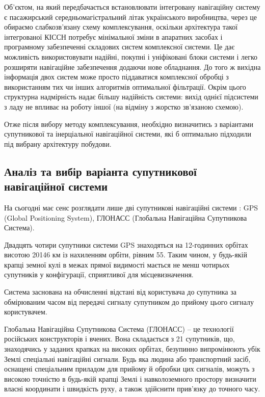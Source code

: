 Об'єктом, на який передбачається встановлювати інтегровану навігаційну систему є пасажирський середньомагістральний літак українського виробництва, через це обираємо  слабкозв’язану схему комплексування, оскільки архітектура такої інтегрованої КІССН потребує мінімальної зміни в апаратних засобах і програмному забезпеченні складових систем комплексної системи. Це дає можливість використовувати надійні, покупні і уніфіковані блоки системи і легко розширяти навігаційне забезпечення додаючи нове обладнання. До того ж вихідна інформація двох систем може просто піддаватися комплексної обробці з використанням тих чи інших алгоритмів оптимальної фільтрації. Окрім цього структурна надмірність надає більшу надійність системи: вихід однієї підсистеми з ладу не впливає на роботу іншої (на відміну з жорстко зв'язаною схемою).

Отже після вибору методу комплексування, необхідно визначитись з варіантами супутникової та інерціальної навігаційної системи, які б оптимально підходили під вибрану архітектуру побудови.


\subsection{Аналіз та вибір варіанта супутникової навігаційної системи}

На сьогодні має сенс розглядати лише дві супутникові навігаційні системи : GPS (Global Positioning System), 
ГЛОНАСС (Глобальна Навігаційна Супутникова Система).

Двадцять чотири супутники системи GPS знаходяться на 12-годинних орбітах висотою 
20146 км із нахиленням орбіти, рівним 55. Таким чином, 
у будь-якій крапці земної кулі в межах прямої видимості мається не менш чотирьох супутників 
у конфігурації, сприятливої для місцевизначення.

Система заснована на обчисленні відстані від користувача до супутника за обмірюваним часом 
від передачі сигналу супутником до прийому цього сигналу користувачем.

Глобальна Навігаційна Супутникова Система (ГЛОНАСС) -- це технології російських конструкторів і вчених.
Вона складається 
з 21 супутників, що, знаходячись у заданих крапках на високих орбітах, безупинно випромінюють 
убік Землі спеціальні навігаційні сигнали. Будь яка людина або транспортний засіб, оснащені 
спеціальним приладом для прийому й обробки цих сигналів, можуть з високою точністю в 
будь-якій крапці Землі і навколоземного простору визначити власні координати і швидкість 
руху, а також здійснити прив'язку до точного часу.

